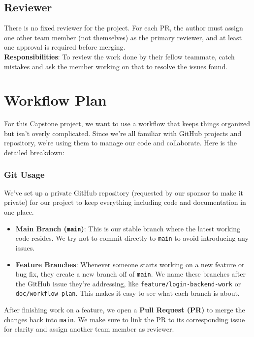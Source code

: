 \documentclass{article}
\begin{document}
\subsection{Reviewer}
There is no fixed reviewer for the project. For each PR, the author must assign one other team member (not themselves) as the primary reviewer, and at least one approval is required before merging.\\
\textbf{Responsibilities}: To review the work done by their fellow teammate, catch mistakes and ask the member working on that to resolve the issues found.

\section{Workflow Plan}

For this Capstone project, we want to use a workflow that keeps things organized but isn't overly complicated. Since we're all familiar with GitHub projects and repository, we're using them to manage our code and collaborate. 
Here is the detailed breakdown:


\subsubsection{Git Usage}

We've set up a private GitHub repository (requested by our sponsor to make it private) for our project to keep everything including code and documentation in one place.

\begin{itemize}
    \item \textbf{Main Branch (\texttt{main})}: This is our stable branch where the latest working code resides. We try not to commit directly to \texttt{main} to avoid introducing any issues.

    \item \textbf{Feature Branches}: Whenever someone starts working on a new feature or bug fix, they create a new branch off of \texttt{main}. We name these branches after the GitHub issue they're addressing, like \texttt{feature/login-backend-work} or \texttt{doc/workflow-plan}. This makes it easy to see what each branch is about.
\end{itemize}

After finishing work on a feature, we open a \textbf{Pull Request (PR)} to merge the changes back into \texttt{main}. We make sure to link the PR to its corresponding issue for clarity and assign another team member as reviewer.
\end{document}
